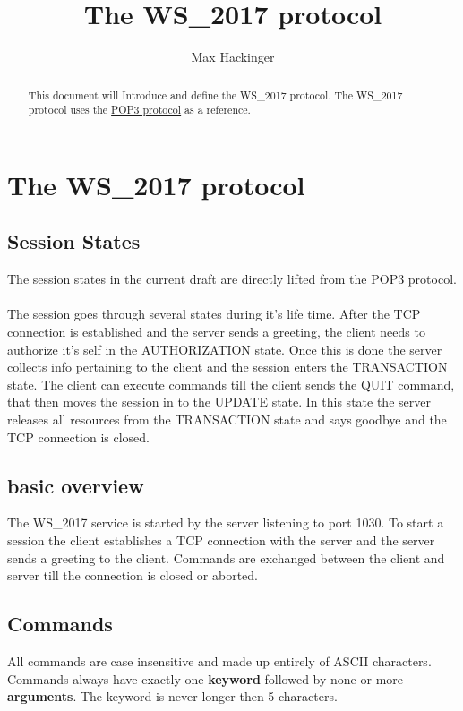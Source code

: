 \documentclass[a4paper,11pt]{article}
\title{The WS\_2017 protocol}
\author{Max Hackinger}
\begin{document}
\maketitle
\tableofcontents
\clearpage

\begin{abstract}
This document will Introduce and define the WS\_2017 protocol.
The WS\_2017 protocol uses the \href{https://tools.ietf.org/html/rfc1939}{POP3 protocol} as a reference.
\end{abstract}

\section{The WS\_2017 protocol}
\subsection{Session States}
The session states in the current draft are directly lifted from the POP3 protocol.\\\\
The session goes through several states during it's life time. After the TCP connection is established and the server sends a greeting, the client needs to authorize it's self in the AUTHORIZATION state. Once this is done the server collects info pertaining to the client and the session enters the TRANSACTION state. The client can execute commands till the client sends the QUIT command, that then moves the session in to the UPDATE state. In this state the server releases all resources from the TRANSACTION state and says goodbye and the TCP connection is closed.
\subsection{basic overview}
The WS\_2017 service is started by the server listening to port 1030. To start a session the client establishes a TCP connection with the server and the server sends a greeting to the client. Commands are exchanged between the client and server till the connection is closed or aborted.
\subsection{Commands}
All commands are case insensitive and made up entirely of ASCII characters. Commands always have exactly one \textbf{keyword} followed by none or more \textbf{arguments}. The keyword is never longer then 5 characters.
\clearpage
\end{document}

